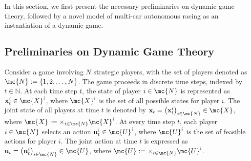 In this section, we first present the necessary preliminaries on dynamic game theory, followed by a novel model of multi-car autonomous racing as an instantiation of a dynamic game.
\subsection{Preliminaries on Dynamic Game Theory}\label{ssec: Preliminaries}
Consider a game involving \(N\) strategic players, with the set of players denoted as \(\mc{N} := \{1, 2, \dots, N\}\). The game proceeds in discrete time steps, indexed by \(t \in \mathbb{N}\). 
At each time step \(t\), the state of player \(i \in \mc{N}\) is represented as \(\mathbf{x}_t^i \in \mc{X}^i\), where \(\mc{X}^i\) is the set of all possible states for player \(i\). The joint state of all players at time \(t\) is denoted by \(\mathbf{x}_t = \left( \mathbf{x}_t^i\right)_{i\in \mc{N}} \in \mc{X}\), where \(\mc{X} := \times_{i\in \mc{N}} \mc{X}^i\).
At every time step \(t\), each player \(i \in \mc{N}\) selects an action \(\mathbf{u}_t^i \in \mc{U}^i\), where \(\mc{U}^i\) is the set of feasible actions for player \(i\). The joint action at time \(t\) is expressed as \(\mathbf{u}_t = \left( \mathbf{u}_t^i\right)_{i\in \mc{N}}  \in \mc{U}\), where \(\mc{U} := \times_{i\in \mc{N}} \mc{U}^i\).

